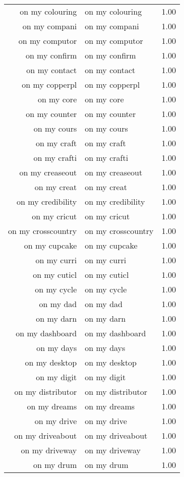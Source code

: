 \begin{table}[ht]
\begin{tabular}{rlr}
  on my colouring & on my colouring & 1.00 \\ 
  on my compani & on my compani & 1.00 \\ 
  on my computor & on my computor & 1.00 \\ 
  on my confirm & on my confirm & 1.00 \\ 
  on my contact & on my contact & 1.00 \\ 
  on my copperpl & on my copperpl & 1.00 \\ 
  on my core & on my core & 1.00 \\ 
  on my counter & on my counter & 1.00 \\ 
  on my cours & on my cours & 1.00 \\ 
  on my craft & on my craft & 1.00 \\ 
  on my crafti & on my crafti & 1.00 \\ 
  on my creaseout & on my creaseout & 1.00 \\ 
  on my creat & on my creat & 1.00 \\ 
  on my credibility & on my credibility & 1.00 \\ 
  on my cricut & on my cricut & 1.00 \\ 
  on my crosscountry & on my crosscountry & 1.00 \\ 
  on my cupcake & on my cupcake & 1.00 \\ 
  on my curri & on my curri & 1.00 \\ 
  on my cuticl & on my cuticl & 1.00 \\ 
  on my cycle & on my cycle & 1.00 \\ 
  on my dad & on my dad & 1.00 \\ 
  on my darn & on my darn & 1.00 \\ 
  on my dashboard & on my dashboard & 1.00 \\ 
  on my days & on my days & 1.00 \\ 
  on my desktop & on my desktop & 1.00 \\ 
  on my digit & on my digit & 1.00 \\ 
  on my distributor & on my distributor & 1.00 \\ 
  on my dreams & on my dreams & 1.00 \\ 
  on my drive & on my drive & 1.00 \\ 
  on my driveabout & on my driveabout & 1.00 \\ 
  on my driveway & on my driveway & 1.00 \\ 
  on my drum & on my drum & 1.00 \\ 

\end{tabular}
\end{table}
